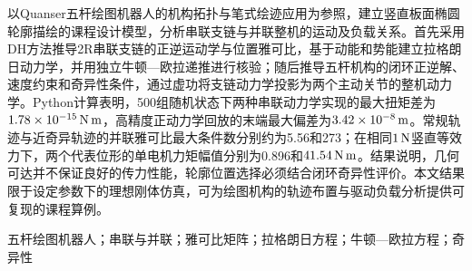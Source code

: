 \!以Quanser五杆绘图机器人的机构拓扑与笔式绘迹应用为参照，建立竖直板面椭圆轮廓描绘的课程设计模型，分析串联支链与并联整机的运动及负载关系。首先采用DH方法推导2R串联支链的正逆运动学与位置雅可比，基于动能和势能建立拉格朗日动力学，并用独立牛顿—欧拉递推进行核验；随后推导五杆机构的闭环正逆解、速度约束和奇异性条件，通过虚功将支链动力学投影为两个主动关节的整机动力学。Python计算表明，500组随机状态下两种串联动力学实现的最大扭矩差为$1.78\times10^{-15}\,\mathrm{N\,m}$，高精度正动力学回放的末端最大偏差为$3.42\times10^{-8}\,\mathrm{m}$。常规轨迹与近奇异轨迹的并联雅可比最大条件数分别约为5.56和273；在相同$1\,\mathrm{N}$竖直等效力下，两个代表位形的单电机力矩幅值分别为0.896和$41.54\,\mathrm{N\,m}$。结果说明，几何可达并不保证良好的传力性能，轮廓位置选择必须结合闭环奇异性评价。本文结果限于设定参数下的理想刚体仿真，可为绘图机构的轨迹布置与驱动负载分析提供可复现的课程算例。

\vspace{6pt}
\!五杆绘图机器人；串联与并联；雅可比矩阵；拉格朗日方程；牛顿—欧拉方程；奇异性
\vspace{5pt}
